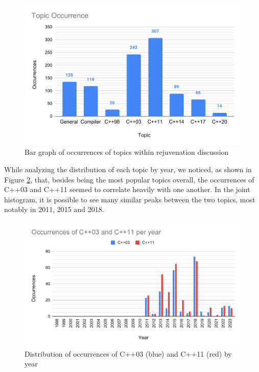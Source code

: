 \begin{figure}[h]
  \centering
  \includegraphics[width=\linewidth]{images/topic_occurrence.pdf}
  \caption{Bar graph of occurrences of topics within rejuvenation discussion}
  \label{fig:topic_occurr}
\end{figure}

While analyzing the distribution of each topic by year, we noticed, as shown in Figure \ref{fig:cpp03_11_year}, that, besides being the most popular topics overall, the occurrences of C++03 and C++11 seemed to correlate heavily with one another. In the joint histogram, it is possible to see many similar peaks between the two topics, most notably in 2011, 2015 and 2018.

\begin{figure}[h]
  \centering
  \includegraphics[width=\linewidth]{images/cpp03_11_year.pdf}
  \caption{Distribution of occurrences of C++03 (blue) and C++11 (red) by year}
  \label{fig:cpp03_11_year}
\end{figure}

